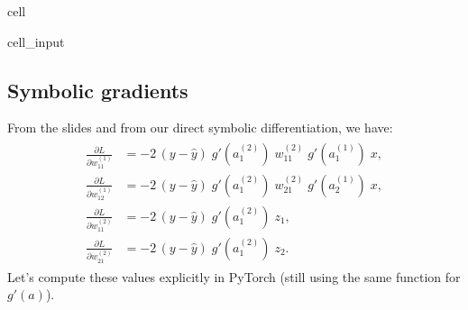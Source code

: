 \documentclass[letterpaper,10pt,english]{jupyterBook}
\begin{document}
\begin{sphinxuseclass}{cell}\begin{sphinxVerbatimInput}

\begin{sphinxuseclass}{cell_input}
\begin{sphinxVerbatim}[commandchars=\\\{\}]
    
    

    
    

        
  

    
\end{sphinxVerbatim}

\end{sphinxuseclass}\end{sphinxVerbatimInput}

\end{sphinxuseclass}

\subsection{Symbolic gradients}
\label{\detokenize{04:symbolic-gradients}}
\sphinxAtStartPar
From the slides and from our direct symbolic differentiation, we have:
\begin{equation*}
\begin{split}\begin{aligned}
\frac{\partial L}{\partial w_{11}^{(1)}} 
&= -2 \,(y - \hat{y})\; g'(a_1^{(2)})\; w_{11}^{(2)}\; g'(a_1^{(1)})\; x,\\
\frac{\partial L}{\partial w_{12}^{(1)}} 
&= -2 \,(y - \hat{y})\; g'(a_1^{(2)})\; w_{21}^{(2)}\; g'(a_2^{(1)})\; x,\\
\frac{\partial L}{\partial w_{11}^{(2)}} 
&= -2 \,(y - \hat{y})\; g'(a_1^{(2)})\; z_1,\\
\frac{\partial L}{\partial w_{21}^{(2)}} 
&= -2 \,(y - \hat{y})\; g'(a_1^{(2)})\; z_2.
\end{aligned}\end{split}
\end{equation*}
\sphinxAtStartPar
Let’s compute these values explicitly in PyTorch (still using the same  function for \(g'(a)\)).
\end{document}
